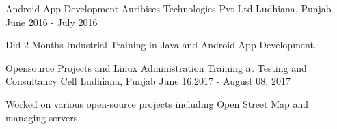 


\begin{cventries}


\cventry
{Android App Development} %
{Auribises Technologies Pvt Ltd } %
{Ludhiana, Punjab } %
{June 2016 - July 2016} %
{ %
\begin{cvitems}
\item {Did 2 Months Industrial Training in Java and Android App Development.}
\end{cvitems}
}
\cventry
{Opensource Projects and Linux Administration} %
{Training at Testing and Consultancy Cell} %
{Ludhiana, Punjab } %
{June 16,2017 - August 08, 2017} %
{ %
\begin{cvitems}
\item {Worked on various open-source projects including Open Street Map and managing servers.}
\end{cvitems}
}
\end{cventries}






